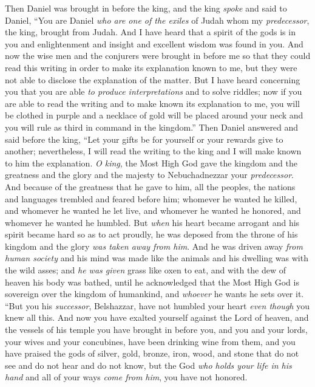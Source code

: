 \begin{biblechapter}
 Then Daniel was brought in before the king, and the king \textit{spoke} and said to Daniel, “You are Daniel \textit{who are one of the exiles} of Judah whom my \textit{predecessor}, the king, brought from Judah.
\verse And I have heard that a spirit of the gods is in you and enlightenment and insight and excellent wisdom was found in you.
\verse And now the wise men and the conjurers were brought in before me so that they could read this writing in order to make its explanation known to me, but they were not able to disclose the explanation of the matter.
\verse But I have heard concerning you that you are able \textit{to produce interpretations} and to solve riddles; now if you are able to read the writing and to make known its explanation to me, you will be clothed in purple and a necklace of gold will be placed around your neck and you will rule as third in command in the kingdom.”
\verse Then Daniel answered and said before the king, “Let your gifts be for yourself or your rewards give to another; nevertheless, I will read the writing to the king and I will make known to him the explanation.
\verse \textit{O king}, the Most High God gave the kingdom and the greatness and the glory and the majesty to Nebuchadnezzar your \textit{predecessor}.
\verse And because of the greatness that he gave to him, all the peoples, the nations and languages trembled and feared before him; whomever he wanted he killed, and whomever he wanted he let live, and whomever he wanted he honored, and whomever he wanted he humbled.
\verse But \textit{when} his heart became arrogant and his spirit became hard so as to act proudly, he was deposed from the throne of his kingdom and the glory \textit{was taken away from him}.
\verse And he was driven away \textit{from human society} and his mind was made like the animals and his dwelling was with the wild asses; and \textit{he was given} grass like oxen to eat, and with the dew of heaven his body was bathed, until he acknowledged that the Most High God is sovereign over the kingdom of humankind, and \textit{whoever} he wants he sets over it.
\verse “But you his \textit{successor}, Belshazzar, have not humbled your heart \textit{even though} you knew all this.
\verse And now you have exalted yourself against the Lord of heaven, and the vessels of his temple you have brought in before you, and you and your lords, your wives and your concubines, have been drinking wine from them, and you have praised the gods of silver, gold, bronze, iron, wood, and stone that do not see and do not hear and do not know, but the God \textit{who holds your life in his hand} and all of your ways \textit{come from him}, you have not honored.

\end{biblechapter}
